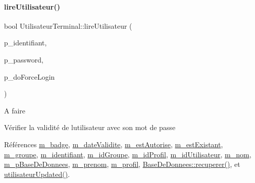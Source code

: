 \paragraph{\texorpdfstring{lire\+Utilisateur()}{lireUtilisateur()}}
{\footnotesize\ttfamily bool Utilisateur\+Terminal\+::lire\+Utilisateur (\begin{DoxyParamCaption}\item[{Q\+String}]{p\+\_\+identifiant,  }\item[{Q\+String}]{p\+\_\+password,  }\item[{bool}]{p\+\_\+do\+Force\+Login }\end{DoxyParamCaption})}

\begin{DoxyRefDesc}{A faire}
\item[\hyperlink{todo__todo000005}{A faire}]Vérifier la validité de l\textquotesingle{}utilisateur avec son mot de passe \end{DoxyRefDesc}


Références \hyperlink{class_utilisateur_terminal_a06e0603919eb3846cf5bd232c105d1a7}{m\+\_\+badge}, \hyperlink{class_utilisateur_terminal_a7af3e6861711071624b93544adf3ca48}{m\+\_\+date\+Validite}, \hyperlink{class_utilisateur_terminal_a79d15bdf8428eb1a131ce4801ac619aa}{m\+\_\+est\+Autorise}, \hyperlink{class_utilisateur_terminal_a6b16983fcb2b0f1f698f595309a67828}{m\+\_\+est\+Existant}, \hyperlink{class_utilisateur_terminal_a824944eb7dc8689a0b0ecfa2fc9e4e6c}{m\+\_\+groupe}, \hyperlink{class_utilisateur_terminal_a4dd1abd0c87ed9bf99ab3343e17cef43}{m\+\_\+identifiant}, \hyperlink{class_utilisateur_terminal_a669ece5480e25b47711c430d020581c2}{m\+\_\+id\+Groupe}, \hyperlink{class_utilisateur_terminal_af3d06352ecbd2d4439626b4ba53b55be}{m\+\_\+id\+Profil}, \hyperlink{class_utilisateur_terminal_a3a8aeb429529ae1600c799e427370f78}{m\+\_\+id\+Utilisateur}, \hyperlink{class_utilisateur_terminal_a4b48835dcadacd5e7d5c9662b70cdc7d}{m\+\_\+nom}, \hyperlink{class_utilisateur_terminal_a93aefda4243fed6c1b74d78fa5fc954d}{m\+\_\+p\+Base\+De\+Donnees}, \hyperlink{class_utilisateur_terminal_a6dc3be09e844fc14aafec8019a1e2a5e}{m\+\_\+prenom}, \hyperlink{class_utilisateur_terminal_ac25eb049eaa55bc16d2f516a551eb769}{m\+\_\+profil}, \hyperlink{class_base_de_donnees_a77539baad389f5acf754cd2cd452403e}{Base\+De\+Donnees\+::recuperer()}, et \hyperlink{class_utilisateur_terminal_ade3153552e04d348ddb5c1ebdb95450a}{utilisateur\+Updated()}.


